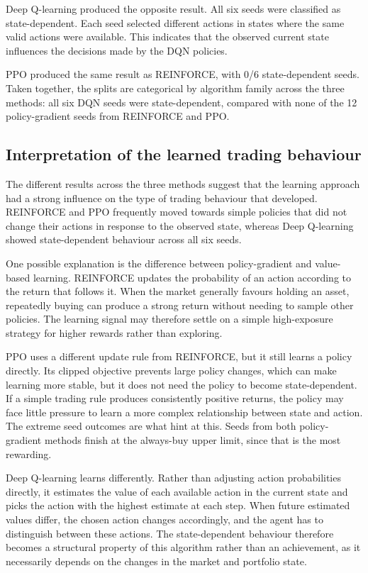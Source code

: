 Deep Q-learning produced the opposite result. All six seeds were
classified as state-dependent. Each seed selected different actions in
states where the same valid actions were available. This indicates that
the observed current state influences the decisions made by the DQN
policies.

PPO produced the same result as REINFORCE, with 0/6 state-dependent
seeds. Taken together, the splits are categorical by algorithm family
across the three methods: all six DQN seeds were state-dependent,
compared with none of the 12 policy-gradient seeds from REINFORCE and
PPO.

\subsection{Interpretation of the learned trading behaviour}

The different results across the three methods suggest that the learning
approach had a strong influence on the type of trading behaviour that
developed. REINFORCE and PPO frequently moved towards simple policies
that did not change their actions in response to the observed state,
whereas Deep Q-learning showed state-dependent behaviour across all six
seeds.

One possible explanation is the difference between policy-gradient and
value-based learning. REINFORCE updates the probability of an action
according to the return that follows it. When the market generally
favours holding an asset, repeatedly buying can produce a strong return
without needing to sample other policies. The learning signal may
therefore settle on a simple high-exposure strategy for higher rewards
rather than exploring.

PPO uses a different update rule from REINFORCE, but it still learns a
policy directly. Its clipped objective prevents large policy changes,
which can make learning more stable, but it does not need the policy to
become state-dependent. If a simple trading rule produces consistently
positive returns, the policy may face little pressure to learn a more
complex relationship between state and action. The extreme seed outcomes
are what hint at this. Seeds from both policy-gradient methods finish at
the always-buy upper limit, since that is the most rewarding.

Deep Q-learning learns differently. Rather than adjusting action
probabilities directly, it estimates the value of each available action
in the current state and picks the action with the highest estimate at
each step. When future estimated values differ, the chosen action
changes accordingly, and the agent has to distinguish between these
actions. The state-dependent behaviour therefore becomes a structural
property of this algorithm rather than an achievement, as it necessarily
depends on the changes in the market and portfolio state.

